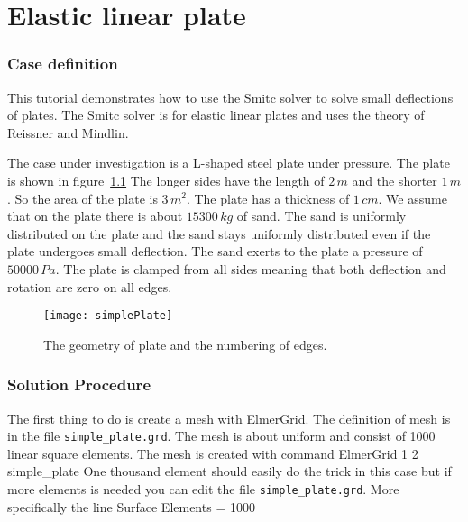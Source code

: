 \chapter{Elastic linear plate}


\subsection*{Case definition}

This tutorial demonstrates how to use the Smitc solver to solve
small deflections of plates.
The Smitc solver is for elastic linear plates and
uses the theory of Reissner and Mindlin.

The case under investigation is a L-shaped steel plate under pressure.
The plate is shown in figure~\ref{fig:simplePlate}
The longer sides have the length of $2\,m$ and the shorter $1\,m$. 
So the area of the plate is $3\,m^2$. The plate has a thickness of
$1\,cm$. We assume that on the plate
there is about $15300\,kg$ of sand. The sand is uniformly distributed
on the plate and the sand stays uniformly distributed even if the 
plate undergoes small deflection. The sand exerts to the plate
a pressure of $50000\,Pa$. The plate is clamped from all sides
meaning that both deflection and rotation are zero on all edges.
%
\begin{figure}[tbhp]
\begin{center}
\texttt{[image: simplePlate]}
\end{center}
\caption{The geometry of plate and the numbering of edges.}
\label{fig:simplePlate}
\end{figure}

\subsection*{Solution Procedure}

The first thing to do is create a mesh with ElmerGrid.
The definition of mesh is in the file \texttt{simple\_plate.grd}.
The mesh is about uniform and consist of 1000 linear square elements.
The mesh is created with command
\ttbegin
ElmerGrid 1 2 simple_plate
\ttend
One thousand element should easily do the trick in this case
but if more elements is needed you can edit the file 
\texttt{simple\_plate.grd}.
More specifically the line
\ttbegin
Surface Elements = 1000
\ttend

